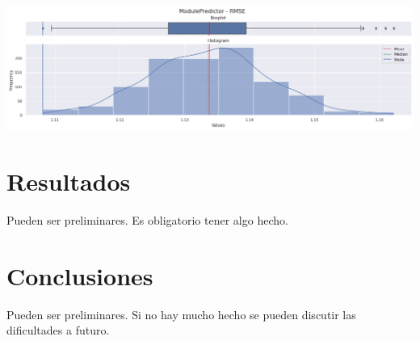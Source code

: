 \documentclass[11pt,a4paper,twoside]{thesis}
\begin{document}
\begin{center}
	\includegraphics[width=15cm]{./images/metrics-DeepFM-RMSE.png}
\end{center}


\chapter{Resultados}

Pueden ser preliminares. Es obligatorio tener algo hecho.


\chapter{Conclusiones}

Pueden ser preliminares. 
Si no hay mucho hecho se pueden discutir las dificultades a futuro.


\backmatter
%
\end{document}
